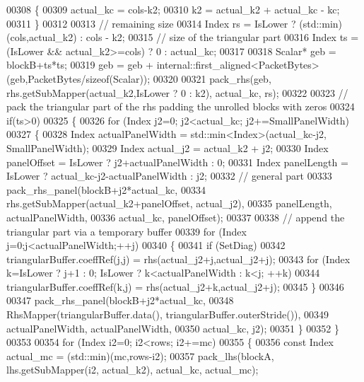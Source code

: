\begin{DoxyCode}
00308       \{
00309         actual\_kc = cols-k2;
00310         k2 = actual\_k2 + actual\_kc - kc;
00311       \}
00312 
00313       \textcolor{comment}{// remaining size}
00314       Index rs = IsLower ? (std::min)(cols,actual\_k2) : cols - k2;
00315       \textcolor{comment}{// size of the triangular part}
00316       Index ts = (IsLower && actual\_k2>=cols) ? 0 : actual\_kc;
00317 
00318       Scalar* geb = blockB+ts*ts;
00319       geb = geb + internal::first\_aligned<PacketBytes>(geb,PacketBytes/\textcolor{keyword}{sizeof}(Scalar));
00320 
00321       pack\_rhs(geb, rhs.getSubMapper(actual\_k2,IsLower ? 0 : k2), actual\_kc, rs);
00322 
00323       \textcolor{comment}{// pack the triangular part of the rhs padding the unrolled blocks with zeros}
00324       \textcolor{keywordflow}{if}(ts>0)
00325       \{
00326         \textcolor{keywordflow}{for} (Index j2=0; j2<actual\_kc; j2+=SmallPanelWidth)
00327         \{
00328           Index actualPanelWidth = std::min<Index>(actual\_kc-j2, SmallPanelWidth);
00329           Index actual\_j2 = actual\_k2 + j2;
00330           Index panelOffset = IsLower ? j2+actualPanelWidth : 0;
00331           Index panelLength = IsLower ? actual\_kc-j2-actualPanelWidth : j2;
00332           \textcolor{comment}{// general part}
00333           pack\_rhs\_panel(blockB+j2*actual\_kc,
00334                          rhs.getSubMapper(actual\_k2+panelOffset, actual\_j2),
00335                          panelLength, actualPanelWidth,
00336                          actual\_kc, panelOffset);
00337 
00338           \textcolor{comment}{// append the triangular part via a temporary buffer}
00339           \textcolor{keywordflow}{for} (Index j=0;j<actualPanelWidth;++j)
00340           \{
00341             \textcolor{keywordflow}{if} (SetDiag)
00342               triangularBuffer.coeffRef(j,j) = rhs(actual\_j2+j,actual\_j2+j);
00343             \textcolor{keywordflow}{for} (Index k=IsLower ? j+1 : 0; IsLower ? k<actualPanelWidth : k<j; ++k)
00344               triangularBuffer.coeffRef(k,j) = rhs(actual\_j2+k,actual\_j2+j);
00345           \}
00346 
00347           pack\_rhs\_panel(blockB+j2*actual\_kc,
00348                          RhsMapper(triangularBuffer.data(), triangularBuffer.outerStride()),
00349                          actualPanelWidth, actualPanelWidth,
00350                          actual\_kc, j2);
00351         \}
00352       \}
00353 
00354       \textcolor{keywordflow}{for} (Index i2=0; i2<rows; i2+=mc)
00355       \{
00356         \textcolor{keyword}{const} Index actual\_mc = (std::min)(mc,rows-i2);
00357         pack\_lhs(blockA, lhs.getSubMapper(i2, actual\_k2), actual\_kc, actual\_mc);

\end{DoxyCode}
